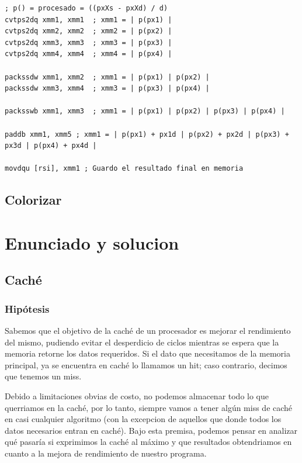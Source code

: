 \documentclass[a4paper]{article}
\newenvironment{codesnippet}{%
	\begin{Sbox}\begin{minipage}{\textwidth}\sffamily\small}%
	{\end{minipage}\end{Sbox}%
		\begin{center}%
		\vspace{-0.4cm}\colorbox{litegrey}{\TheSbox}\end{center}\vspace{0.3cm}}
\begin{document}
\begin{codesnippet}
\begin{internallinenumbers}
\begin{verbatim}
; p() = procesado = ((pxXs - pxXd) / d)
cvtps2dq xmm1, xmm1  ; xmm1 = | p(px1) |
cvtps2dq xmm2, xmm2  ; xmm2 = | p(px2) |
cvtps2dq xmm3, xmm3  ; xmm3 = | p(px3) |
cvtps2dq xmm4, xmm4  ; xmm4 = | p(px4) |

packssdw xmm1, xmm2  ; xmm1 = | p(px1) | p(px2) |
packssdw xmm3, xmm4  ; xmm3 = | p(px3) | p(px4) |

packsswb xmm1, xmm3  ; xmm1 = | p(px1) | p(px2) | p(px3) | p(px4) |

paddb xmm1, xmm5 ; xmm1 = | p(px1) + px1d | p(px2) + px2d | p(px3) + px3d | p(px4) + px4d |

movdqu [rsi], xmm1 ; Guardo el resultado final en memoria
\end{verbatim}
\end{internallinenumbers}
\end{codesnippet}
\clearpage
\subsection{Colorizar}

\clearpage
\section{Enunciado y solucion}

\subsection{Caché}

\subsubsection*{Hipótesis}

Sabemos que el objetivo de la caché de un procesador es mejorar el rendimiento del mismo, pudiendo evitar el desperdicio de ciclos mientras se espera que la memoria retorne los datos requeridos. Si el dato que necesitamos de la memoria principal, ya se encuentra en caché lo llamamos un hit; caso contrario, decimos que tenemos un miss.

Debido a limitaciones obvias de costo, no podemos almacenar todo lo que querriamos en la caché, por lo tanto, siempre vamos a tener algún miss de caché en casi cualquier algoritmo (con la excepcion de aquellos que donde todos los datos necesarios entran en caché). Bajo esta premisa, podemos pensar en analizar qué pasaría si exprimimos la caché al máximo y que resultados obtendriamos en cuanto a la mejora de rendimiento de nuestro programa.
\end{document}
